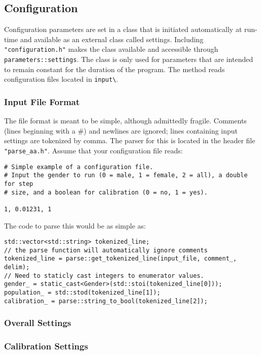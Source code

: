 \documentclass{article}
\begin{document}
\subsection{Configuration}
Configuration parameters are set in a class that is initiated automatically at run-time and available as an external class called settings. Including \verb|"configuration.h"| makes the class available and accessible through \verb|parameters::settings|. The class is only used for parameters that are intended to remain constant for the duration of the program. The method reads configuration files located in \verb|input\|.

\subsubsection{Input File Format}
The file format is meant to be simple, although admittedly fragile. Comments (lines beginning with a \#) and newlines are ignored; lines containing input settings are tokenized by comma. The parser for this is located in the header file \verb|"parse_aa.h"|. Assume that your configuration file reads:
\begin{verbatim}
# Simple example of a configuration file.
# Input the gender to run (0 = male, 1 = female, 2 = all), a double for step
# size, and a boolean for calibration (0 = no, 1 = yes).

1, 0.01231, 1
\end{verbatim}
The code to parse this would be as simple as:
\begin{verbatim}
std::vector<std::string> tokenized_line;
// the parse function will automatically ignore comments
tokenized_line = parse::get_tokenized_line(input_file, comment_, delim);
// Need to staticly cast integers to enumerator values.
gender_ = static_cast<Gender>(std::stoi(tokenized_line[0]));
population_ = std::stod(tokenized_line[1]);
calibration_ = parse::string_to_bool(tokenized_line[2]);
\end{verbatim}
\subsubsection{Overall Settings}
\subsubsection{Calibration Settings}
\end{document}
